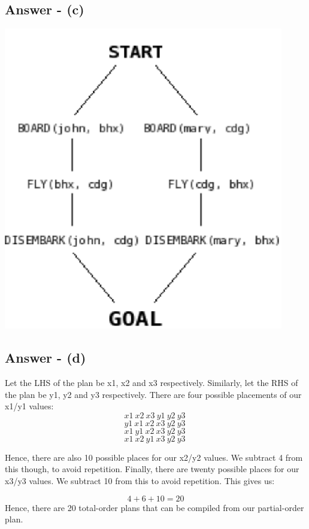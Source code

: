 \documentclass{article}
\begin{document}
\subsection{Answer - (c)}
\begin{center}
\includegraphics{IntroToAIE2PartialPlan.png}
\end{center}
\subsection{Answer - (d)}
Let the LHS of the plan be x1, x2 and x3 respectively. Similarly, let the RHS of the plan be y1, y2 and y3 respectively. There are four possible placements of our x1/y1 values: \\

$$ x1\ x2\ x3\ y1\ y2\ y3\ $$
$$ y1\ x1\ x2\ x3\ y2\ y3\ $$
$$ x1\ y1\ x2\ x3\ y2\ y3\ $$
$$ x1\ x2\ y1\ x3\ y2\ y3\ $$

Hence, there are also 10 possible places for our x2/y2 values. We subtract 4 from this though, to avoid repetition. Finally, there are twenty possible places for our x3/y3 values. We subtract 10 from this to avoid repetition. This gives us:

$$4 + 6 + 10 = 20$$
Hence, there are 20 total-order plans that can be compiled from our partial-order plan.
\end{document}
